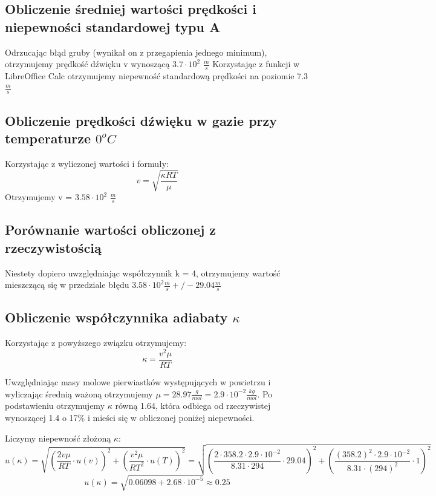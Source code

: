 \documentclass{article}
\begin{document}
\subsection{Obliczenie średniej wartości prędkości i niepewności standardowej typu A}
Odrzucając błąd gruby (wynikał on z przegapienia jednego minimum), otrzymujemy prędkość dźwięku v wynoszącą $3.7 \cdot 10^2$ $\frac{m}{s}$
Korzystając z funkcji w LibreOffice Calc otrzymujemy niepewność standardową prędkości na poziomie 7.3 $\frac{m}{s}$

\subsection{Obliczenie prędkości dźwięku w gazie przy temperaturze $0^{o} C$}
Korzystając z wyliczonej wartości i formuły:
\begin{equation}
	v = \sqrt{\frac{\kappa RT}{\mu}}
\end{equation}
Otrzymujemy v = $3.58 \cdot 10^2$ $\frac{m}{s}$

\subsection{Porównanie wartości obliczonej z rzeczywistością}
Niestety dopiero uwzględniając współczynnik k = 4, otrzymujemy wartość mieszczącą się w przedziale błędu $3.58 \cdot 10^2 \frac{m}{s} +/- 29.04 \frac{m}{s}$

\subsection{Obliczenie współczynnika adiabaty $\kappa$}

Korzystając z powyższego związku otrzymujemy:
\begin{equation}
	\kappa = \frac{v^{2}\mu}{RT}
\end{equation}

Uwzględniając masy molowe pierwiastków występujących w powietrzu i wyliczając średnią ważoną otrzymujemy $\mu = 28.97 \frac{g}{mol} = 2.9 \cdot 10^{-2} \frac{kg}{mol}$. Po podstawieniu otrzymujemy $\kappa$ równą 1.64, która odbiega od rzeczywistej wynoszącej 1.4 o 17\% i mieści się w obliczonej poniżej niepewności.

Liczymy niepewność złożoną $\kappa$:
\begin{equation}
	u(\kappa) = \sqrt{(\frac{2v\mu}{RT} \cdot u(v))^2 + (\frac{v^2\mu}{RT^2} \cdot u(T))^2} = \sqrt{(\frac{2 \cdot 358.2 \cdot 2.9 \cdot 10^{-2}}{8.31 \cdot 294} \cdot 29.04)^2+(\frac{(358.2)^2 \cdot 2.9 \cdot 10^{-2}}{8.31 \cdot (294)^2} \cdot 1)^2}
\end{equation}
\begin{equation}
	u(\kappa) = \sqrt{0.06098+2.68 \cdot 10^{-5}} \approx 0.25
\end{equation}
\end{document}
